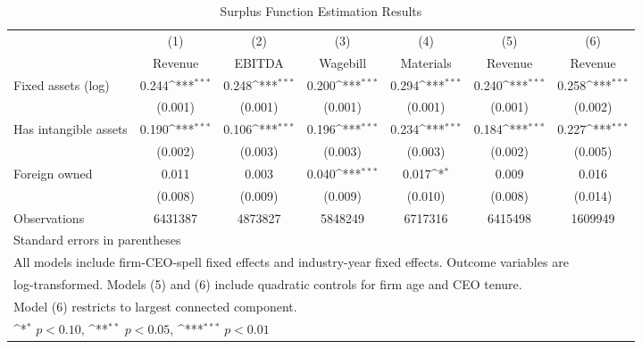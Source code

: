 \begin{table}[htbp]\centering
\def\sym#1{\ifmmode^{#1}\else\(^{#1}\)\fi}
\caption{Surplus Function Estimation Results}
\begin{tabular}{l*{6}{c}}
\toprule
                    &\multicolumn{1}{c}{(1)}&\multicolumn{1}{c}{(2)}&\multicolumn{1}{c}{(3)}&\multicolumn{1}{c}{(4)}&\multicolumn{1}{c}{(5)}&\multicolumn{1}{c}{(6)}\\
                    &\multicolumn{1}{c}{Revenue}&\multicolumn{1}{c}{EBITDA}&\multicolumn{1}{c}{Wagebill}&\multicolumn{1}{c}{Materials}&\multicolumn{1}{c}{Revenue}&\multicolumn{1}{c}{Revenue}\\
\midrule
Fixed assets (log)  &       0.244\sym{***}&       0.248\sym{***}&       0.200\sym{***}&       0.294\sym{***}&       0.240\sym{***}&       0.258\sym{***}\\
                    &     (0.001)         &     (0.001)         &     (0.001)         &     (0.001)         &     (0.001)         &     (0.002)         \\
\addlinespace
Has intangible assets&       0.190\sym{***}&       0.106\sym{***}&       0.196\sym{***}&       0.234\sym{***}&       0.184\sym{***}&       0.227\sym{***}\\
                    &     (0.002)         &     (0.003)         &     (0.003)         &     (0.003)         &     (0.002)         &     (0.005)         \\
\addlinespace
Foreign owned       &       0.011         &       0.003         &       0.040\sym{***}&       0.017\sym{*}  &       0.009         &       0.016         \\
                    &     (0.008)         &     (0.009)         &     (0.009)         &     (0.010)         &     (0.008)         &     (0.014)         \\
\midrule
Observations        &     6431387         &     4873827         &     5848249         &     6717316         &     6415498         &     1609949         \\
\bottomrule
\multicolumn{7}{l}{\footnotesize Standard errors in parentheses}\\
\multicolumn{7}{l}{\footnotesize All models include firm-CEO-spell fixed effects and industry-year fixed effects. Outcome variables are}\\
\multicolumn{7}{l}{\footnotesize log-transformed. Models (5) and (6) include quadratic controls for firm age and CEO tenure.}\\
\multicolumn{7}{l}{\footnotesize Model (6) restricts to largest connected component.}\\
\multicolumn{7}{l}{\footnotesize \sym{*} \(p<0.10\), \sym{**} \(p<0.05\), \sym{***} \(p<0.01\)}\\
\end{tabular}
\end{table}
